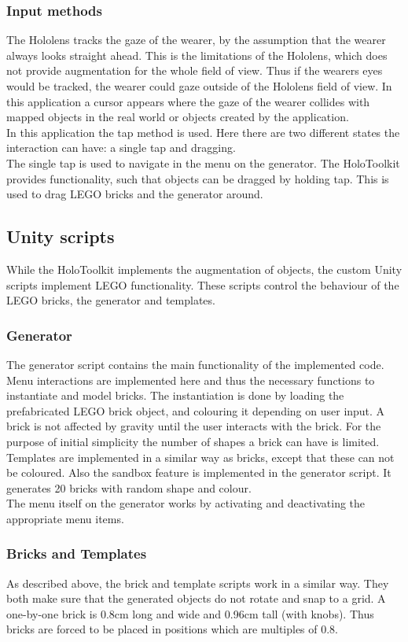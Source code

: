 \subsubsection{Input methods}
The Hololens tracks the gaze of the wearer, by the assumption that the wearer always looks straight ahead. This is the limitations of the Hololens, which does not provide augmentation for the whole field of view. Thus if the wearers eyes would be tracked, the wearer could gaze outside of the Hololens field of view. In this application a cursor appears where the gaze of the wearer collides with mapped objects in the real world or objects created by the application.\\ 
In this application the tap method is used. Here there are two different states the interaction can have: a single tap and dragging. \\
The single tap is used to navigate in the menu on the generator. The HoloToolkit provides functionality, such that objects can be dragged by holding tap. This is used to drag LEGO bricks and the generator around.

\subsection{Unity scripts}
While the HoloToolkit implements the augmentation of objects, the custom Unity scripts implement LEGO functionality. These scripts control the behaviour of the LEGO bricks, the generator and templates. 

\subsubsection{Generator}
The generator script contains the main functionality of the implemented code. Menu interactions are implemented here and thus the necessary functions to instantiate and model bricks. The instantiation is done by loading the prefabricated LEGO brick object, and colouring it depending on user input. A brick is not affected by gravity until the user interacts with the brick. For the purpose of initial simplicity the number of shapes a brick can have is limited. \\
Templates are implemented in a similar way as bricks, except that these can not be coloured. Also the sandbox feature is implemented in the generator script. It generates 20 bricks with random shape and colour. \\
The menu itself on the generator works by activating and deactivating the appropriate menu items.

\subsubsection{Bricks and Templates}
As described above, the brick and template scripts work in a similar way. They both make sure that the generated objects do not rotate and snap to a grid. A one-by-one brick is 0.8cm long and wide and 0.96cm tall (with knobs). Thus bricks are forced to be placed in positions which are multiples of 0.8.